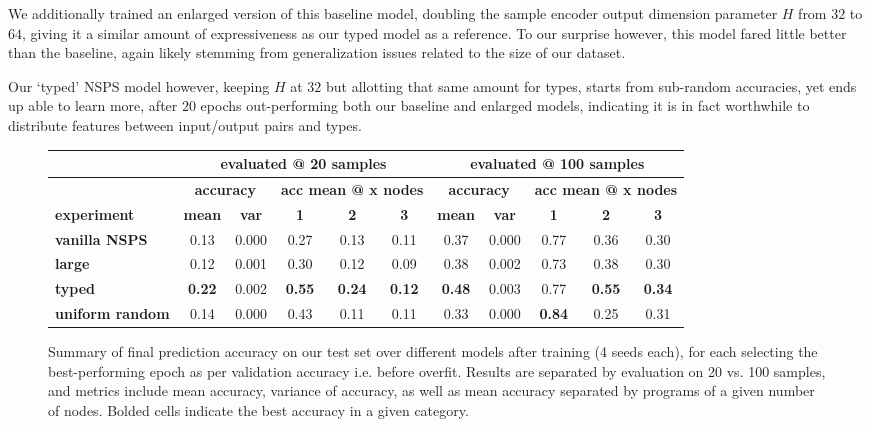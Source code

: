 \documentclass{article} %
\begin{document}
We additionally trained an enlarged version of this baseline model,
doubling the sample encoder output dimension parameter $H$ from $32$ to $64$,
giving it a similar amount of expressiveness as our typed model as a reference.
To our surprise however, this model
fared little better than the baseline, again likely stemming
from generalization issues related to the size of our dataset.

Our `typed' NSPS model however,
keeping $H$ at $32$ but allotting that same amount for types,
starts from sub-random accuracies, yet ends up able to learn more,
after $20$ epochs out-performing both our baseline and enlarged models,
indicating it is in fact worthwhile to distribute features between input/output pairs and types.

\begin{figure}
    \begin{tabular}{|l|c|c|c|c|c|c|c|c|c|c|} \hline
        & \multicolumn{5}{|c|}{ \textbf{evaluated @ 20 samples} } & \multicolumn{5}{|c|}{ \textbf{evaluated @ 100 samples} } \\ \hline
        & \multicolumn{2}{|c|}{ \textbf{accuracy} } & \multicolumn{3}{|c|}{ \textbf{acc mean @ x nodes} } & \multicolumn{2}{|c|}{ \textbf{accuracy} } & \multicolumn{3}{|c|}{ \textbf{acc mean @ x nodes} } \\ \hline
        \textbf{experiment} & \textbf{mean} & \textbf{var} & \textbf{1} & \textbf{2} & \textbf{3} & \textbf{mean} & \textbf{var} & \textbf{1} & \textbf{2} & \textbf{3} \\ \hline
        \textbf{vanilla NSPS} & 0.13 & 0.000 & 0.27 & 0.13 & 0.11 & 0.37 & 0.000 & 0.77 & 0.36 & 0.30 \\ \hline
        \textbf{large} & 0.12 & 0.001 & 0.30 & 0.12 & 0.09 & 0.38 & 0.002 & 0.73 & 0.38 & 0.30 \\ \hline
        \textbf{typed} & \textbf{0.22} & 0.002 & \textbf{0.55} & \textbf{0.24} & \textbf{0.12} & \textbf{0.48} & 0.003 & 0.77 & \textbf{0.55} & \textbf{0.34} \\ \hline
        \textbf{uniform random} & 0.14 & 0.000 & 0.43 & 0.11 & 0.11 & 0.33 & 0.000 & \textbf{0.84} & 0.25 & 0.31 \\ \hline
    \end{tabular}
\caption{
    Summary of final prediction accuracy on our test set over different models after training (4 seeds each),
    for each selecting the best-performing epoch as per validation accuracy i.e. before overfit.
    Results are separated by evaluation on 20 vs. 100 samples,
    and metrics include mean accuracy, variance of accuracy,
    as well as mean accuracy separated by programs of a given number of nodes. Bolded cells indicate the best accuracy in a given category.
}
\label{fig:finalacc}
\end{figure}
\end{document}
